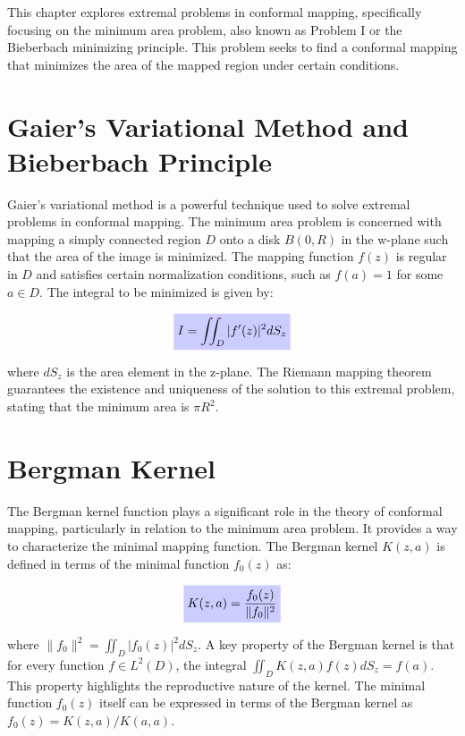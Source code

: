 \documentclass[12pt, a4paper]{report}
\newcommand{\highlight}[2]{\colorbox{#1!20}{$\displaystyle #2$}}
\newcommand{\impformula}[1]{\highlight{blue}{#1}}
\begin{document}
This chapter explores extremal problems in conformal mapping, specifically focusing on the minimum area problem, also known as Problem I or the Bieberbach minimizing principle. This problem seeks to find a conformal mapping that minimizes the area of the mapped region under certain conditions.

\section{Gaier's Variational Method and Bieberbach Principle}

Gaier's variational method is a powerful technique used to solve extremal problems in conformal mapping. The minimum area problem is concerned with mapping a simply connected region $D$ onto a disk $B(0,R)$ in the w-plane such that the area of the image is minimized. The mapping function $f(z)$ is regular in $D$ and satisfies certain normalization conditions, such as $f(a) = 1$ for some $a \in D$. The integral to be minimized is given by:

\begin{equation}
    \impformula{I = \iint_D |f'(z)|^2 dS_z} \label{eq:min_area_integral}
\end{equation}

where $dS_z$ is the area element in the z-plane. The Riemann mapping theorem guarantees the existence and uniqueness of the solution to this extremal problem, stating that the minimum area is $\pi R^2$.

\section{Bergman Kernel}

The Bergman kernel function plays a significant role in the theory of conformal mapping, particularly in relation to the minimum area problem. It provides a way to characterize the minimal mapping function. The Bergman kernel $K(z,a)$ is defined in terms of the minimal function $f_0(z)$ as:

\begin{equation}
    \impformula{K(z,a) = \frac{f_0(z)}{\|f_0\|^2}} \label{eq:bergman_kernel_def}
\end{equation}

where $\|f_0\|^2 = \iint_D |f_0(z)|^2 dS_z$. A key property of the Bergman kernel is that for every function $f \in L^2(D)$, the integral $\iint_D K(z,a)f(z)dS_z = f(a)$. This property highlights the reproductive nature of the kernel. The minimal function $f_0(z)$ itself can be expressed in terms of the Bergman kernel as $f_0(z) = K(z,a)/K(a,a)$.
\end{document}
